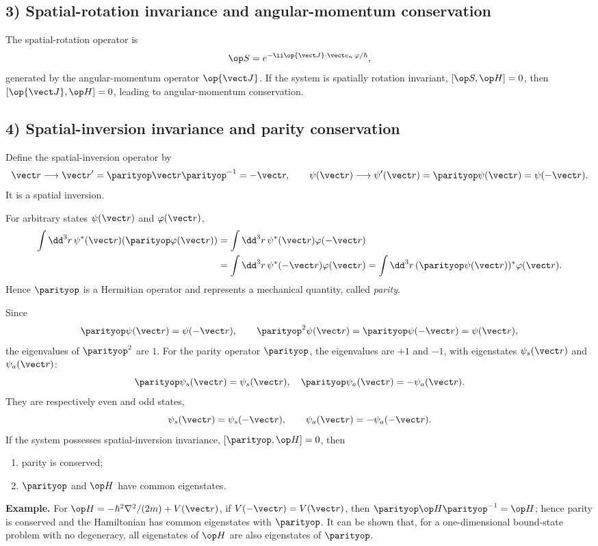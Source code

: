 \subsection*{3) Spatial-rotation invariance and angular-momentum conservation}
The spatial-rotation operator is
\[\op S=e^{-\ii\op{\vect J}\cdot\vect e_n\,\varphi/\hbar},\]
generated by the angular-momentum operator $\op{\vect J}$. If the system is spatially rotation invariant, $[\op S,\op H]=0$, then $[\op{\vect J},\op H]=0$, leading to angular-momentum conservation.

\subsection*{4) Spatial-inversion invariance and parity conservation}
Define the spatial-inversion operator by
\[\vect r\longrightarrow\vect r'=\parityop\vect r\parityop^{-1}=-\vect r,
\qquad \psi(\vect r)\longrightarrow\psi'(\vect r)
=\parityop\psi(\vect r)=\psi(-\vect r).\]
It is a spatial inversion.

For arbitrary states $\psi(\vect r)$ and $\varphi(\vect r)$,
\begin{align*}
\int\dd^3r\,\psi^*(\vect r)(\parityop\varphi(\vect r))
&=\int\dd^3r\,\psi^*(\vect r)\varphi(-\vect r)\\
&=\int\dd^3r\,\psi^*(-\vect r)\varphi(\vect r)
=\int\dd^3r\,(\parityop\psi(\vect r))^*\varphi(\vect r).
\end{align*}
Hence $\parityop$ is a Hermitian operator and represents a mechanical quantity, called \emph{parity}.

Since
\[\parityop\psi(\vect r)=\psi(-\vect r),\qquad
\parityop^2\psi(\vect r)=\parityop\psi(-\vect r)=\psi(\vect r),\]
the eigenvalues of $\parityop^2$ are $1$. For the parity operator $\parityop$, the eigenvalues are $+1$ and $-1$, with eigenstates $\psi_s(\vect r)$ and $\psi_a(\vect r)$:
\[\parityop\psi_s(\vect r)=\psi_s(\vect r),\quad
\parityop\psi_a(\vect r)=-\psi_a(\vect r).\]
They are respectively even and odd states,
\[\psi_s(\vect r)=\psi_s(-\vect r),\qquad
\psi_a(\vect r)=-\psi_a(-\vect r).\]
If the system possesses spatial-inversion invariance, $[\parityop,\op H]=0$, then
\begin{enumerate}[label=\alph*)]
\item parity is conserved;
\item $\parityop$ and $\op H$ have common eigenstates.
\end{enumerate}
\textbf{Example.} For $\op H=-\hbar^2\nabla^2/(2m)+V(\vect r)$, if $V(-\vect r)=V(\vect r)$, then $\parityop\op H\parityop^{-1}=\op H$; hence parity is conserved and the Hamiltonian has common eigenstates with $\parityop$. It can be shown that, for a one-dimensional bound-state problem with no degeneracy, all eigenstates of $\op H$ are also eigenstates of $\parityop$.

